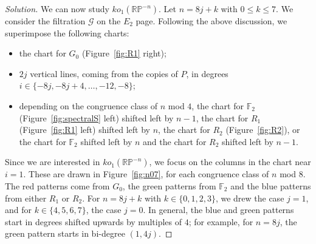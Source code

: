 \documentclass{amsart}
\def\RP{\mathbb{RP}}
\def\ko{\mathit{ko}}
\def\Gilt{\mathcal{G}}
\newcommand{\FF}{\mathbb{F}}
\begin{document}
\begin{proof}[Solution]
We can now study $\ko_1(\RP^{-n})$. Let $n = 8j+k$ with
$0 \leq k \leq 7$. We consider the filtration $\Gilt$ on the $E_2$
page. Following the above discussion, we superimpose the following
charts:
\begin{itemize}[leftmargin=*]
\item the chart for $G_0$ (Figure~\ref{fig:R1} right);
\item $2j$ vertical lines, coming from the copies of $P$, in degrees $i \in \{-8j, -8j+4, \dots, -12, -8\}$;
\item depending on the congruence class of $n$ mod $4$, the chart for
  $\FF_2$ (Figure~\ref{fig:spectralS} left) shifted left by $n-1$, the
  chart for $R_1$ (Figure~\ref{fig:R1} left) shifted left by $n$, the
  chart for $R_2$ (Figure~\ref{fig:R2}), or the chart for $\FF_2$
  shifted left by $n$ and the chart for $R_2$ shifted left by $n-1$.
\end{itemize}

Since we are interested in $ko_1(\RP^{-n})$, we focus on the columns
in the chart near $i=1$. These are drawn in Figure~\ref{fig:n07}, for
each congruence class of $n$ mod $8$.  The red patterns come from
$G_0$, the green patterns from $\FF_2$ and the blue patterns from
either $R_1$ or $R_2$. For $n=8j+k$ with $k \in \{0,1,2,3\}$, we drew
the case $j=1$, and for $k \in \{4,5,6,7\}$, the case $j=0$. In
general, the blue and green patterns start in degrees shifted upwards
by multiples of $4$; for example, for $n=8j$, the green pattern starts
in bi-degree $(1, 4j)$.

 


\end{proof}
\end{document}
